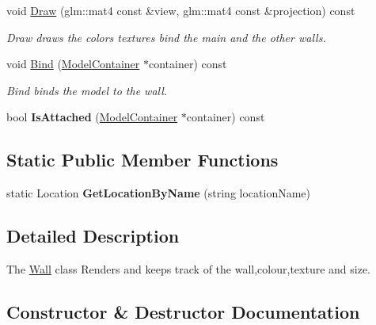 \begin{DoxyCompactItemize}
\item 
void \hyperlink{class_wall_ac5293b39064ec52d57c90023481bc047}{Draw} (glm\+::mat4 const \&view, glm\+::mat4 const \&projection) const 
\begin{DoxyCompactList}\small\item\em Draw draws the colors textures bind the main and the other walls. \end{DoxyCompactList}\item 
void \hyperlink{class_wall_a90d245563ab3c20a09bd6596f4ea2657}{Bind} (\hyperlink{class_model_container}{Model\+Container} $\ast$container) const 
\begin{DoxyCompactList}\small\item\em Bind binds the model to the wall. \end{DoxyCompactList}\item 
\hypertarget{class_wall_a66a659d911e11bf8b91e5e7fe151baee}{}bool {\bfseries Is\+Attached} (\hyperlink{class_model_container}{Model\+Container} $\ast$container) const \label{class_wall_a66a659d911e11bf8b91e5e7fe151baee}

\end{DoxyCompactItemize}
\subsection*{Static Public Member Functions}
\begin{DoxyCompactItemize}
\item 
\hypertarget{class_wall_a1eb94a21287c2298197949567dbbfe74}{}static Location {\bfseries Get\+Location\+By\+Name} (string location\+Name)\label{class_wall_a1eb94a21287c2298197949567dbbfe74}

\end{DoxyCompactItemize}


\subsection{Detailed Description}
The \hyperlink{class_wall}{Wall} class Renders and keeps track of the wall,colour,texture and size. 

\subsection{Constructor \& Destructor Documentation}
\hypertarget{class_wall_a63c0ce873bd396cd64328bc789d9b52d}{}
